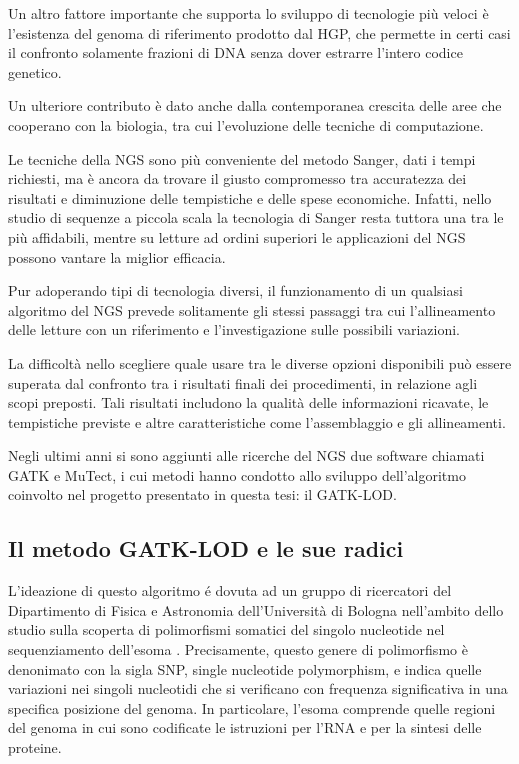 Un altro fattore importante che supporta lo sviluppo di tecnologie più veloci è l'esistenza del genoma di riferimento prodotto dal HGP, che permette in certi casi il confronto solamente frazioni di DNA senza dover estrarre l'intero codice genetico.

Un ulteriore contributo è dato anche dalla contemporanea crescita delle aree che cooperano con la biologia, tra cui l'evoluzione delle tecniche di computazione.

Le tecniche della NGS sono più conveniente del metodo Sanger, dati i tempi richiesti, ma è ancora da trovare il giusto compromesso tra accuratezza dei risultati e diminuzione delle tempistiche e delle spese economiche.
Infatti, nello studio di sequenze a piccola scala la tecnologia di Sanger resta tuttora una tra le più affidabili, mentre su letture ad ordini superiori le applicazioni del NGS possono vantare la miglior efficacia.

Pur adoperando tipi di tecnologia diversi, il funzionamento di un qualsiasi algoritmo del NGS prevede solitamente gli stessi passaggi tra cui l'allineamento delle letture con un riferimento e l'investigazione sulle possibili variazioni.

La difficoltà nello scegliere quale usare tra le diverse opzioni disponibili può essere superata dal confronto tra i risultati finali dei procedimenti, in relazione agli scopi preposti. 
Tali risultati includono la qualità delle informazioni ricavate, le tempistiche previste e altre caratteristiche come l'assemblaggio e gli allineamenti.

Negli ultimi anni si sono aggiunti alle ricerche del NGS due software chiamati GATK e MuTect, i cui metodi hanno condotto allo sviluppo dell'algoritmo coinvolto nel progetto presentato in questa tesi: il GATK-LOD.


\subsection{Il metodo GATK-LOD e le sue radici}
L'ideazione di questo algoritmo é dovuta ad un gruppo di ricercatori del Dipartimento di Fisica e Astronomia dell'Università di Bologna nell'ambito dello studio sulla scoperta di polimorfismi somatici del singolo nucleotide nel sequenziamento dell'esoma \cite{DoValle2016}.
Precisamente, questo genere di polimorfismo è denonimato con la sigla SNP, single nucleotide polymorphism, e indica quelle variazioni nei singoli nucleotidi che si verificano con frequenza significativa in una specifica posizione del genoma.
In particolare, l'esoma comprende quelle regioni del genoma in cui sono codificate le istruzioni per l'RNA e per la sintesi delle proteine.

